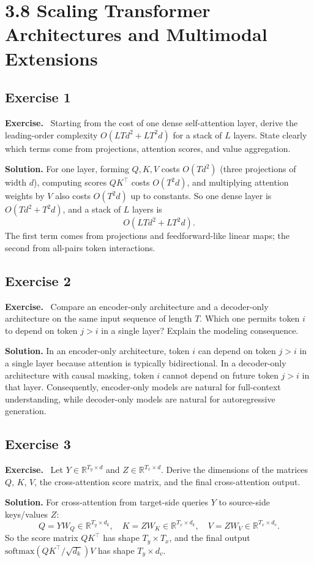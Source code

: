 \documentclass[11pt]{article}
\newenvironment{exercisebox}{\begin{framed}\noindent\textbf{Exercise.}\ }{\end{framed}}
\begin{document}
\section{3.8 Scaling Transformer Architectures and Multimodal Extensions}
\subsection*{Exercise 1}
\begin{exercisebox}
Starting from the cost of one dense self-attention layer, derive the leading-order complexity \(O(LTd^2 + LT^2 d)\) for a stack of \(L\) layers.
    State clearly which terms come from projections, attention scores, and value aggregation.
\end{exercisebox}
\textbf{Solution.} For one layer, forming $Q,K,V$ costs $O(Td^2)$ (three projections of width $d$), computing scores $QK^\top$ costs $O(T^2d)$, and multiplying attention weights by $V$ also costs $O(T^2d)$ up to constants. So one dense layer is $O(Td^2+T^2d)$, and a stack of $L$ layers is
\[
O(LTd^2+LT^2d).
\]
The first term comes from projections and feedforward-like linear maps; the second from all-pairs token interactions.

\subsection*{Exercise 2}
\begin{exercisebox}
Compare an encoder-only architecture and a decoder-only architecture on the same input sequence of length \(T\).
    Which one permits token \(i\) to depend on token \(j>i\) in a single layer?
    Explain the modeling consequence.
\end{exercisebox}
\textbf{Solution.} In an encoder-only architecture, token $i$ can depend on token $j>i$ in a single layer because attention is typically bidirectional. In a decoder-only architecture with causal masking, token $i$ cannot depend on future token $j>i$ in that layer. Consequently, encoder-only models are natural for full-context understanding, while decoder-only models are natural for autoregressive generation.

\subsection*{Exercise 3}
\begin{exercisebox}
Let \(Y \in \mathbb{R}^{T_y \times d}\) and \(Z \in \mathbb{R}^{T_x \times d}\).
    Derive the dimensions of the matrices \(Q\), \(K\), \(V\), the cross-attention score matrix, and the final cross-attention output.
\end{exercisebox}
\textbf{Solution.} For cross-attention from target-side queries $Y$ to source-side keys/values $Z$:
\[
Q=YW_Q\in\mathbb R^{T_y\times d_k},\quad K=ZW_K\in\mathbb R^{T_x\times d_k},\quad V=ZW_V\in\mathbb R^{T_x\times d_v}.
\]
So the score matrix $QK^\top$ has shape $T_y\times T_x$, and the final output $\mathrm{softmax}(QK^\top/\sqrt{d_k})V$ has shape $T_y\times d_v$.
\end{document}

